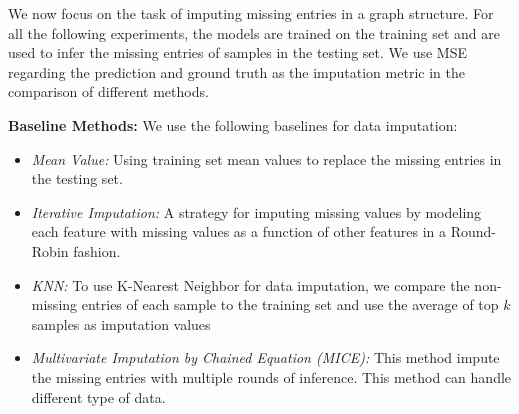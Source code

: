 \documentclass[twoside]{article}
\begin{document}
We now focus on the task of imputing missing entries in a graph structure.
For all the following experiments, the models are trained on the training set and are used to infer the missing entries of samples in the testing set. We use MSE  regarding the prediction and ground truth as the imputation metric in the comparison of different methods. 

\textbf{Baseline Methods:} We use the following baselines for data imputation:\vspace{-0.05in}
\begin{itemize}
\item \textit{Mean Value:} Using training set mean values to replace the missing entries in the testing set.   
\item \textit{Iterative Imputation:} A strategy for imputing missing values by modeling each feature with missing values as a function of other features in a Round-Robin fashion.   

\item \textit{KNN:} To use K-Nearest Neighbor for data imputation,  we compare the non-missing entries of each sample to the training set and use the  average of top $k$ samples as imputation values   

\item \textit{Multivariate Imputation by Chained Equation (MICE):} This method impute the missing entries with multiple  rounds of inference. This method can handle different type of data.
\end{itemize}  
\end{document}
